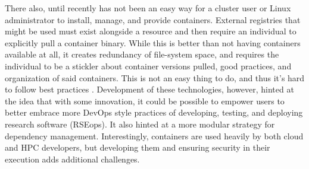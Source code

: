 There also, until recently \cite{shpc} has not been an easy way for a cluster user or Linux administrator to install, manage, and provide containers. External registries that might be used \cite{sregistry,distribution-spec} must exist alongside a resource and then require an individual to explicitly pull a container binary. While this is better than not having containers available at all, it creates redundancy of file-system space, and requires the individual to be a stickler about container versions pulled, good practices, and organization of said containers. This is not an easy thing to do, and thus it's hard to follow best practices \cite{ten-simple-rules}. Development of these technologies, however, hinted at the idea that with some innovation, it could be possible to empower users to better embrace more DevOps style practices of developing, testing, and deploying research software (RSE\-ops). It also hinted at a more modular strategy for dependency management. Interestingly, containers are used heavily by both cloud and HPC developers, but developing them and ensuring security in their execution adds additional challenges.